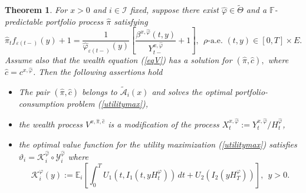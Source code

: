 \documentclass[11pt]{article}
\theoremstyle{plain}
\newtheorem{theorem}{Theorem}[section]
\theoremstyle{definition}
\numberwithin{equation}{section}
\newcommand{\calA}{\mathcal{A}}
\newcommand{\calI}{\mathcal{I}}
\newcommand{\eps}{\varepsilon}
\newcommand{\Exp}{\mathds{E}}
\newcommand{\Fil}{\mathds{F}}
\begin{document}
\begin{theorem}\label{main}
For $x>0$ and $i\in\calI$ fixed, suppose there exist $\hat{\varphi} \in \tilde{\Theta}$ and a $\Fil$-predictable portfolio process $\hat{\pi}$ satisfying
\begin{equation}\label{pif}
\hat{\pi}_tf_{\eps(t-)}(y)+1=\frac{1}{\hat{\varphi}_{\eps(t-)}(y)}\left[\frac{\beta^{x,\hat{\varphi}}(t,y)}{Y_{t-}^{x,\hat{\varphi}}}+1\right], \ \ \rho\mbox{-a.e. }(t,y)\in [0,T]\times E.
\end{equation}
Assume also that the wealth equation (\ref{eqV}) has a solution for $ (\hat{\pi} , \hat{c}),$ where $\hat{c}=c^{x,\hat{\varphi}}$. Then the following assertions hold

\begin{itemize}
   \item[(a)] The pair $(\hat{\pi} , \hat{c})$ belongs to $\tilde{\calA}_i(x)$ and solves the optimal portfolio-consumption problem (\ref{utilitymax}),
   \item[(b)] the wealth process $V^{x,\hat{\pi},\hat{c}}$ is a modification of the process $X_t^{x,\hat{\varphi}}:=Y_t^{x,\hat{\varphi}}/H_t^{\hat{\varphi}}$,
   \item[(c)] the optimal value function for the utility maximization (\ref{utilitymax}) satisfies $\vartheta_i=\mathcal{K}_i^{\hat{\varphi}}\circ\mathcal{Y}_i^{\hat{\varphi}}$ where
\[
\mathcal{K}_i^{\varphi}(y):=\Exp_i\left[\int_0^TU_1(t,I_1(t,yH_t^{\varphi}))\,dt+U_2(I_2(yH_T^{\varphi}))\right], \ \ y>0.
\]
 \end{itemize}
\end{theorem}
\end{document}
